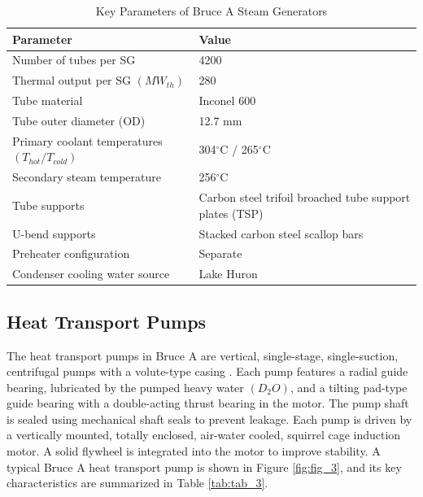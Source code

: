 \documentclass[12pt]{article}
\begin{document}
\begin{table}[h]
    \centering
    \caption{Key Parameters of Bruce A Steam Generators \cite{tapping2000candu}}
    \label{tab:tab_2}
    \renewcommand{\arraystretch}{1.2}
    \begin{tabularx}{\textwidth}{X X} %
    \hline
    \textbf{Parameter} & \textbf{Value} \\ 
    \hline
    Number of tubes per SG & 4200  \\ 
    Thermal output per SG $(MW_{th})$ & 280 \\ 
    Tube material & Inconel 600 \\ 
    Tube outer diameter (OD) & 12.7 mm \\ 
    Primary coolant temperatures $(T_{hot} / T_{cold})$ & 304$^{\circ}$C / 265$^{\circ}$C \\ 
    Secondary steam temperature & 256$^{\circ}$C \\ 
    Tube supports & Carbon steel trifoil broached tube support plates (TSP) \\ 
    U-bend supports & Stacked carbon steel scallop bars \\ 
    Preheater configuration & Separate \\ 
    Condenser cooling water source & Lake Huron \\ 
    \hline
    \end{tabularx}
\end{table}

\begin{multicols}{2}
    \subsection{Heat Transport Pumps}

    The heat transport pumps in Bruce A are vertical, single-stage, single-suction, centrifugal pumps with a volute-type casing \cite{pon_2024_my8h2-66b34}. Each pump features a radial guide bearing, lubricated by the pumped heavy water $(D_{2}O)$, and a tilting pad-type guide bearing with a double-acting thrust bearing in the motor. The pump shaft is sealed using mechanical shaft seals to prevent leakage. Each pump is driven by a vertically mounted, totally enclosed, air-water cooled, squirrel cage induction motor. A solid flywheel is integrated into the motor to improve stability. A typical Bruce A heat transport pump is shown in Figure \ref{fig:fig_3}, and its key characteristics are summarized in Table \ref{tab:tab_3}.
    
\end{multicols}
\end{document}
